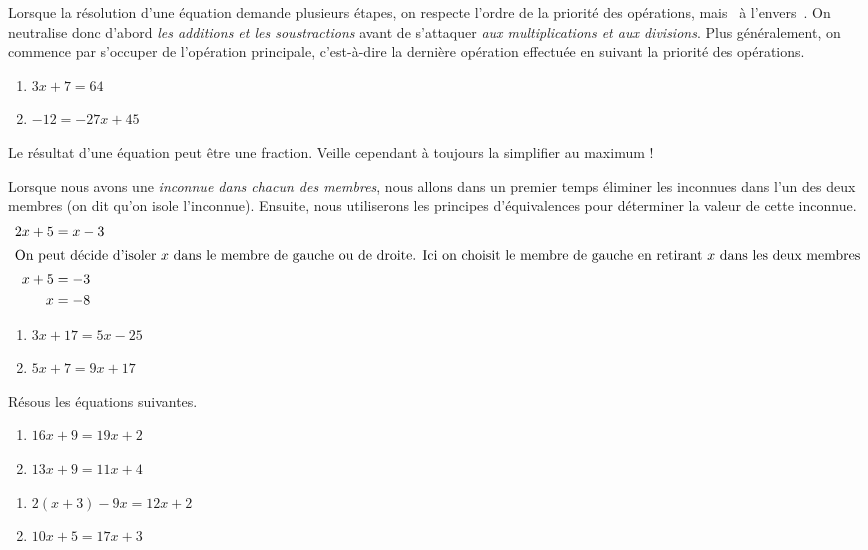 \documentclass[../math2.tex]{subfiles}
\begin{document}
Lorsque la résolution d'une équation demande plusieurs étapes, on
respecte l'ordre de la priorité des opérations, mais \og~à l'envers~\fg{}. On
neutralise donc d'abord \emph{les additions et les soustractions}
avant de s'attaquer \emph{aux multiplications et aux divisions}. Plus généralement, on commence par s'occuper de l'opération principale, c'est-à-dire la dernière opération effectuée en suivant la priorité des opérations.

\exemples
\begin{enumerate}[cols=2]
  \item $3x+7=64$
  \item $-12 = -27x+45$
\end{enumerate}
\vspace*{5cm}

 Le résultat d'une équation peut être une fraction. Veille
  cependant à toujours la simplifier au maximum !


Lorsque nous avons une \emph{inconnue dans chacun des membres}, nous
allons dans un premier temps éliminer les inconnues dans l'un des deux
membres (on dit qu'on isole l'inconnue). Ensuite, nous utiliserons les principes d'équivalences pour déterminer la valeur de cette inconnue.
\begin{align*}
  2x + 5 &= x - 3\\
  \intertext{On peut décide d'isoler $x$ dans le membre de gauche ou de droite. Ici on choisit le membre de gauche en retirant $x$ dans les deux membres}
  x + 5 &= -3\\
  x &= -8
\end{align*}

\exemples
\begin{enumerate}[cols=2]
  \item $3x + 17 = 5x - 25$
  \item $5x+7=9x+17$
\end{enumerate}
\vspace*{5cm}

\begin{exercise}
  Résous les équations suivantes.
  \begin{enumerate}[cols=2]
    \item $16x+9=19x+2$
    \item $13x+9=11x+4$
  \end{enumerate}
  \newpage
  \begin{enumerate}[cols=2, resume]
    \item $2(x + 3) - 9x = 12x + 2$
    \item $10x+5=17x+3$
  \end{enumerate}
  \vspace*{5cm}
\end{exercise}
\end{document}
